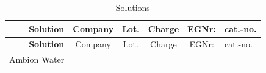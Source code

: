 \documentclass[11pt,singlespacinge,twoside]{reedthesis} %
\begin{document}
\begin{longtable}[]{@{}rccccl@{}}
\caption{\label{tab:mat-sol} Solutions}\tabularnewline
\toprule
\begin{minipage}[b]{0.19\columnwidth}\raggedleft
\textbf{Solution}\strut
\end{minipage} & \begin{minipage}[b]{0.15\columnwidth}\centering
Company\strut
\end{minipage} & \begin{minipage}[b]{0.12\columnwidth}\centering
Lot.\strut
\end{minipage} & \begin{minipage}[b]{0.12\columnwidth}\centering
Charge\strut
\end{minipage} & \begin{minipage}[b]{0.12\columnwidth}\centering
EGNr:\strut
\end{minipage} & \begin{minipage}[b]{0.14\columnwidth}\raggedright
cat.-no.\strut
\end{minipage}\tabularnewline
\midrule
\endfirsthead
\toprule
\begin{minipage}[b]{0.19\columnwidth}\raggedleft
\textbf{Solution}\strut
\end{minipage} & \begin{minipage}[b]{0.15\columnwidth}\centering
Company\strut
\end{minipage} & \begin{minipage}[b]{0.12\columnwidth}\centering
Lot.\strut
\end{minipage} & \begin{minipage}[b]{0.12\columnwidth}\centering
Charge\strut
\end{minipage} & \begin{minipage}[b]{0.12\columnwidth}\centering
EGNr:\strut
\end{minipage} & \begin{minipage}[b]{0.14\columnwidth}\raggedright
cat.-no.\strut
\end{minipage}\tabularnewline
\midrule
\endhead
\begin{minipage}[t]{0.19\columnwidth}\raggedleft
Ambion Water\strut
\end{minipage} & \begin{minipage}[t]{0.15\columnwidth}\centering
\strut
\end{minipage} & \begin{minipage}[t]{0.12\columnwidth}\centering
\strut
\end{minipage} & \begin{minipage}[t]{0.12\columnwidth}\centering

\end{minipage}
\end{longtable}
\end{document}
